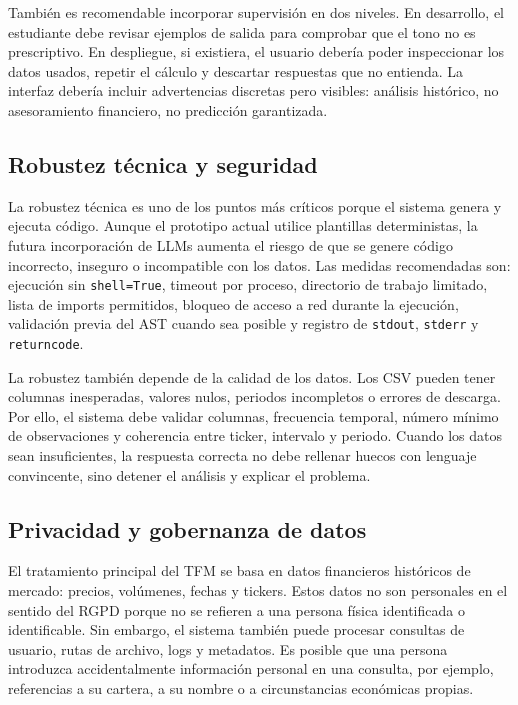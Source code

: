 \documentclass{article}
\begin{document}
También es recomendable incorporar supervisión en dos niveles. En desarrollo, el estudiante debe revisar ejemplos de salida para comprobar que el tono no es prescriptivo. En despliegue, si existiera, el usuario debería poder inspeccionar los datos usados, repetir el cálculo y descartar respuestas que no entienda. La interfaz debería incluir advertencias discretas pero visibles: análisis histórico, no asesoramiento financiero, no predicción garantizada.

\subsection{Robustez técnica y seguridad}

La robustez técnica es uno de los puntos más críticos porque el sistema genera y ejecuta código. Aunque el prototipo actual utilice plantillas deterministas, la futura incorporación de LLMs aumenta el riesgo de que se genere código incorrecto, inseguro o incompatible con los datos. Las medidas recomendadas son: ejecución sin \texttt{shell=True}, timeout por proceso, directorio de trabajo limitado, lista de imports permitidos, bloqueo de acceso a red durante la ejecución, validación previa del AST cuando sea posible y registro de \texttt{stdout}, \texttt{stderr} y \texttt{returncode}.

La robustez también depende de la calidad de los datos. Los CSV pueden tener columnas inesperadas, valores nulos, periodos incompletos o errores de descarga. Por ello, el sistema debe validar columnas, frecuencia temporal, número mínimo de observaciones y coherencia entre ticker, intervalo y periodo. Cuando los datos sean insuficientes, la respuesta correcta no debe rellenar huecos con lenguaje convincente, sino detener el análisis y explicar el problema.

\subsection{Privacidad y gobernanza de datos}

El tratamiento principal del TFM se basa en datos financieros históricos de mercado: precios, volúmenes, fechas y tickers. Estos datos no son personales en el sentido del RGPD porque no se refieren a una persona física identificada o identificable. Sin embargo, el sistema también puede procesar consultas de usuario, rutas de archivo, logs y metadatos. Es posible que una persona introduzca accidentalmente información personal en una consulta, por ejemplo, referencias a su cartera, a su nombre o a circunstancias económicas propias.
\end{document}
